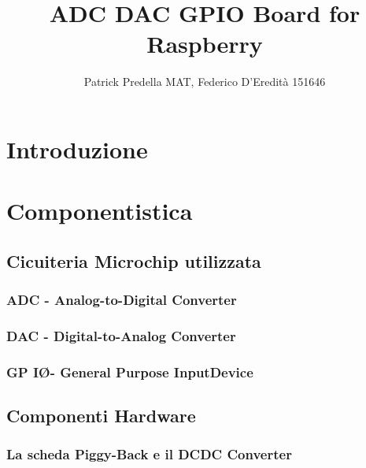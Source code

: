 \documentclass[10pt]{article}
\title{ADC DAC GPIO Board for Raspberry}
\author{Patrick Predella MAT, Federico D'Eredità 151646 }
\date{}
\begin{document}
\maketitle

\section{Introduzione}

\section{Componentistica}
	\subsection{Cicuiteria Microchip utilizzata} %

		\subsubsection{ADC - Analog-to-Digital Converter}

		\subsubsection{DAC - Digital-to-Analog Converter}

		\subsubsection{GP I\O - General Purpose Input\Output Device}

	\subsection{Componenti Hardware}
		\subsubsection{La scheda Piggy-Back e il DCDC Converter}
\end{document}
